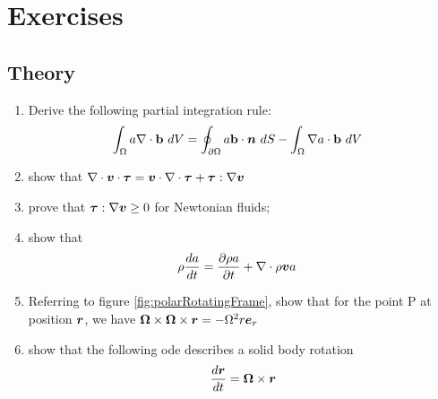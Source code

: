 \section{Exercises}
\label{principles:exercises}

\subsection*{Theory}
\label{exercise:principles:theory}

\begin{enumerate} 
\item Derive the following partial integration rule:
  \begin{align*}
    \int_{\Omega} a \nabla \cdot \mathbf b ~dV &= \oint_{{\partial \Omega}} a \mathbf b \cdot
    \boldsymbol {n}~dS - \int_{\Omega} \nabla a \cdot \mathbf b ~dV
  \end{align*}
\item show that $\nabla \cdot \boldsymbol {v} \cdot \boldsymbol {\tau} = \boldsymbol {v} \cdot \nabla \cdot \boldsymbol {\tau} + \boldsymbol {\tau} : \nabla \boldsymbol {v}$
\item prove that $\boldsymbol {\tau} : \nabla \boldsymbol {v} \geq 0$ for Newtonian
  fluids;
\item show that 
  \begin{align*}
    \rho \frac{da}{dt} &= \frac{\partial  \rho a}{\partial t} + \nabla \cdot \rho \boldsymbol {v} a
  \end{align*}
\item Referring to figure \ref{fig:polarRotatingFrame}, show that for
  the point P at position $\boldsymbol {r}$, we have $\boldsymbol {\Omega} \times \boldsymbol {\Omega} \times
  \boldsymbol {r} = - \Omega^2 r \boldsymbol e_{r}$
\item show that the following ode describes a solid body rotation
  \begin{align*}
    \frac{d\boldsymbol {r}}{dt} = \boldsymbol {\Omega} \times \boldsymbol {r}
  \end{align*}
\end{enumerate}




